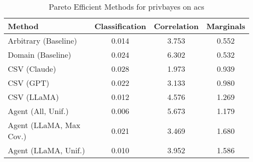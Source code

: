 \begin{table}[t!]
    \centering
    \caption{Pareto Efficient Methods for privbayes on acs}
    \label{tab:pareto_efficient_methods_privbayes_acs}
    \begin{tabular}{lccc}
    \toprule
    Method & Classification & Correlation & Marginals \\
    \midrule
    Arbitrary (Baseline) & 0.014 & 3.753 & \cellcolor{silver!30}0.552 \\
    Domain (Baseline) & 0.024 & 6.302 & \cellcolor{gold!30}0.532 \\
    CSV (Claude) & 0.028 & \cellcolor{gold!30}1.973 & \cellcolor{bronze!30}0.939 \\
    CSV (GPT) & 0.022 & \cellcolor{silver!30}3.133 & 0.980 \\
    CSV (LLaMA) & \cellcolor{bronze!30}0.012 & 4.576 & 1.269 \\
    Agent (All, Unif.) & \cellcolor{gold!30}0.006 & 5.673 & 1.179 \\
    Agent (LLaMA, Max Cov.) & 0.021 & \cellcolor{bronze!30}3.469 & 1.680 \\
    Agent (LLaMA, Unif.) & \cellcolor{silver!30}0.010 & 3.952 & 1.586 \\
    \bottomrule
    \end{tabular}
\end{table}